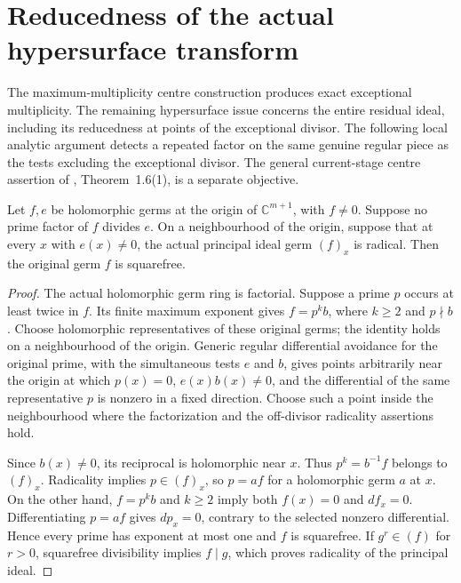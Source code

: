 \section{Reducedness of the actual hypersurface transform}
\label{sec:hironaka-hypersurface-strict-ideal}

The maximum-multiplicity centre construction produces exact exceptional
multiplicity.  The remaining hypersurface issue concerns the entire residual
ideal, including its reducedness at points of the exceptional divisor.
The following local analytic argument detects a repeated factor on the same
genuine regular piece as the tests excluding the exceptional divisor.
The general current-stage centre assertion of
\cite{bierstone-milman97-invent-math}, Theorem~1.6(1), is a separate objective.

\begin{lemma}
\label{hir:reduced-germ-across-divisor}
\leanok
Let $f,e$ be holomorphic germs at the origin of $\mathbb C^{m+1}$, with
$f\ne0$.  Suppose no prime factor of $f$ divides $e$.  On a neighbourhood
of the origin, suppose that at every $x$ with $e(x)\ne0$, the actual
principal ideal germ $(f)_x$ is radical.  Then the original germ $f$ is
squarefree.
\end{lemma}
\begin{proof}
The actual holomorphic germ ring is factorial.  Suppose a prime $p$ occurs
at least twice in $f$.  Its finite maximum exponent gives
$f=p^k b$, where $k\ge2$ and $p\nmid b$.  Choose holomorphic
representatives of these original germs; the identity holds on a
neighbourhood of the origin.  Generic regular differential avoidance for
the original prime, with the simultaneous tests $e$ and $b$, gives points
arbitrarily near the origin at which $p(x)=0$, $e(x)b(x)\ne0$, and the
differential of the same representative $p$ is nonzero in a fixed direction.
Choose such a point inside the neighbourhood where the factorization and
the off-divisor radicality assertions hold.

Since $b(x)\ne0$, its reciprocal is holomorphic near $x$.  Thus
$p^k=b^{-1}f$ belongs to $(f)_x$.  Radicality implies $p\in(f)_x$,
so $p=af$ for a holomorphic germ $a$ at $x$.  On the other hand,
$f=p^k b$ and $k\ge2$ imply both $f(x)=0$ and $df_x=0$.
Differentiating $p=af$ gives $dp_x=0$, contrary to the selected
nonzero differential.  Hence every prime has exponent at most one and
$f$ is squarefree.  If $g^r\in(f)$ for $r>0$, squarefree divisibility
implies $f\mid g$, which proves radicality of the principal ideal.
\end{proof}

